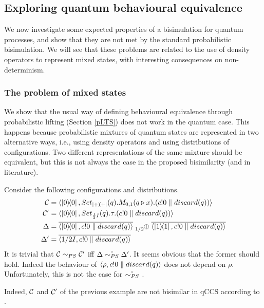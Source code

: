 \subsection{Exploring quantum behavioural equivalence}
We now investigate some expected properties of a bisimulation for quantum processes, and show that they are not met by the standard probabilistic bisimulation. We will see that these problems are related to the use of density operators to represent mixed states, with interesting consequences on non-determinism.

\subsubsection*{The problem of mixed states}

We show that the usual way of defining behavioural equivalence through probabilistic lifting (Section \ref{pLTS}) does not work in the quantum case.
This happens because probabilistic mixtures of quantum states are represented in two alternative ways, i.e., using density operators and using distributions of configurations.
Two different representations of the same mixture should be equivalent, but this is not always the case in the proposed bisimilarity (and in literature).

\begin{example}
	Consider the following configurations and distributions.
	\begin{align*}
		\conf &= \confw{\ketbra{0}{0}, Set_{\ketbra{+}{+}}(q).M_{0,1}(q \triangleright x).(c!0 \parallel discard(q))}\\
		\conf' &= \confw{\ketbra{0}{0}, Set_{\frac{1}{2} I}(q).\tau.(c!0 \parallel discard(q))}\\
		\Delta &= \overline{\confw{\ketbra{0}{0}, c!0 \parallel discard(q)}} \psum{1/2} \overline{\confw{\ketbra{1}{1}, c!0 \parallel discard(q)}}\\
		\Delta' &= \overline{\confw{1/2 I, c!0 \parallel discard(q)}}
	\end{align*}
	It is trivial that $\mathcal{C} \sim_{PS} \mathcal{C}'$ iff $\Delta	\stackrel{\scriptscriptstyle \circ}{\sim_{PS}} \Delta'$.
	It seems obvious that the former should hold.
	Indeed the behaviour of $\langle\rho, c!0 \parallel discard(q)\rangle$ does not depend on $\rho$.
	Unfortunately, this is not the case for $\stackrel{\scriptscriptstyle \circ}{\sim_{PS}}$ .
\end{example}
Indeed, $\mathcal{C}$ and $\mathcal{C}'$ of the previous example are not bisimilar in qCCS according to \cite{fengBisimulationQuantumProcesses2012, dengOpenBisimulationQuantum2012}.

